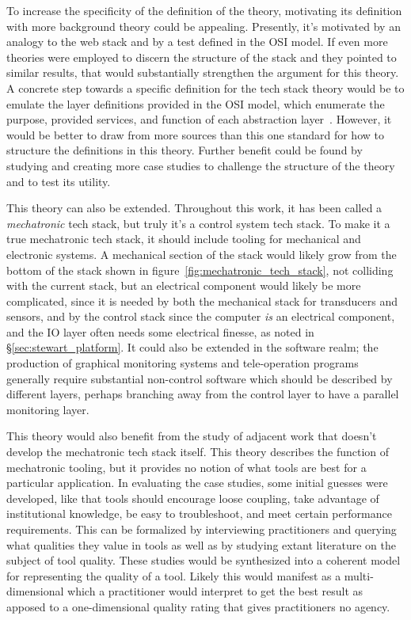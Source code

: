 \documentclass[english,12pt,a4paper,pdftex,eng,utf8]{aaltothesis}
\begin{document}
To increase the specificity of the definition of the theory, motivating its definition with more background theory could be appealing.  Presently, it's motivated by an analogy to the web stack and by a test defined in the OSI model.  If even more theories were employed to discern the structure of the stack and they pointed to similar results, that would substantially strengthen the argument for this theory.  A concrete step towards a specific definition for the tech stack theory would be to emulate the layer definitions provided in the OSI model, which enumerate the purpose, provided services, and function of each abstraction layer~\cite[§7]{ISO7498-1}.  However, it would be better to draw from more sources than this one standard for how to structure the definitions in this theory.  Further benefit could be found by studying and creating more case studies to challenge the structure of the theory and to test its utility.

This theory can also be extended.  Throughout this work, it has been called a \textit{mechatronic} tech stack, but truly it's a control system tech stack.  To make it a true mechatronic tech stack, it should include tooling for mechanical and electronic systems.  A mechanical section of the stack would likely grow from the bottom of the stack shown in figure~\ref{fig:mechatronic_tech_stack}, not colliding with the current stack, but an electrical component would likely be more complicated, since it is needed by both the mechanical stack for transducers and sensors, and by the control stack since the computer \textit{is} an electrical component, and the IO layer often needs some electrical finesse, as noted in §\ref{sec:stewart_platform}.  It could also be extended in the software realm; the production of graphical monitoring systems and tele-operation programs generally require substantial non-control software which should be described by different layers, perhaps branching away from the control layer to have a parallel monitoring layer.

This theory would also benefit from the study of adjacent work that doesn't develop the mechatronic tech stack itself.  This theory describes the function of mechatronic tooling, but it provides no notion of what tools are best for a particular application.  In evaluating the case studies, some initial guesses were developed, like that tools should encourage loose coupling, take advantage of institutional knowledge, be easy to troubleshoot, and meet certain performance requirements.  This can be formalized by interviewing practitioners and querying what qualities they value in tools as well as by studying extant literature on the subject of tool quality.  These studies would be synthesized into a coherent model for representing the quality of a tool.  Likely this would manifest as a multi-dimensional which a practitioner would interpret to get the best result as apposed to a one-dimensional quality rating that gives practitioners no agency.
\end{document}
